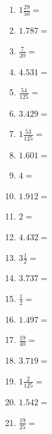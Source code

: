 \documentclass[12pt]{article}
\begin{document}
\begin{enumerate}
\item \large $ 1 \frac{29}{50} = $ \vspace{1.5cm}
\newpage
\item \large $ 1.787 = $ \vspace{1.5cm}
\item \large $ \frac{7}{20} = $ \vspace{1.5cm}
\item \large $ 4.531 = $ \vspace{1.5cm}
\item \large $ \frac{54}{125} = $ \vspace{1.5cm}
\item \large $ 3.429 = $ \vspace{1.5cm}
\item \large $ 1 \frac{53}{125} = $ \vspace{1.5cm}
\item \large $ 1.601 = $ \vspace{1.5cm}
\item \large $ 4 = $ \vspace{1.5cm}
\item \large $ 1.912 = $ \vspace{1.5cm}
\item \large $ 2 = $ \vspace{1.5cm}
\newpage
\item \large $ 4.432 = $ \vspace{1.5cm}
\item \large $ 3 \frac{1}{2} = $ \vspace{1.5cm}
\item \large $ 3.737 = $ \vspace{1.5cm}
\item \large $ \frac{1}{2} = $ \vspace{1.5cm}
\item \large $ 1.497 = $ \vspace{1.5cm}
\item \large $ \frac{19}{40} = $ \vspace{1.5cm}
\item \large $ 3.719 = $ \vspace{1.5cm}
\item \large $ 1 \frac{2}{125} = $ \vspace{1.5cm}
\item \large $ 1.542 = $ \vspace{1.5cm}
\item \large $ \frac{19}{25} = $ \vspace{1.5cm}

\end{enumerate}
\end{document}
